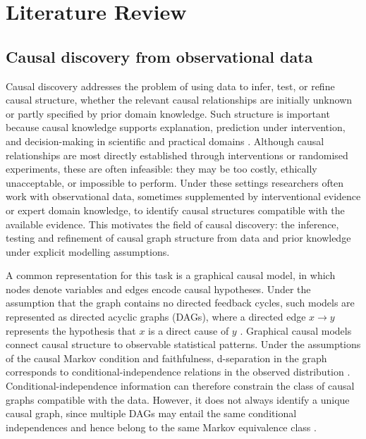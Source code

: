 \chapter{Literature Review}

\section{Causal discovery from observational data}
Causal discovery addresses the problem of using data to infer, test, or refine causal structure, whether the relevant causal relationships are initially unknown or partly specified by prior domain knowledge. Such structure is important because causal knowledge supports explanation, prediction under intervention, and decision-making in scientific and practical domains \cite{glymour2019review,vowels2022d}. Although causal relationships are most directly established through interventions or randomised experiments, these are often infeasible: they may be too costly, ethically unacceptable, or impossible to perform. Under these settings researchers often work with observational data, sometimes supplemented by interventional evidence or expert domain knowledge, to identify causal structures compatible with the available evidence. This motivates the field of causal discovery: the inference, testing and refinement of causal graph structure from data and prior knowledge under explicit modelling assumptions.

A common representation for this task is a graphical causal model, in which nodes denote variables and edges encode causal hypotheses. Under the assumption that the graph contains no directed feedback cycles, such models are represented as directed acyclic graphs (DAGs), where a directed edge \(x \to y\) represents the hypothesis that \(x\) is a direct cause of \(y\) \cite{glymour2019review}. Graphical causal models connect causal structure to observable statistical patterns. Under the assumptions of the causal Markov condition and faithfulness, d-separation in the graph corresponds to conditional-independence relations in the observed distribution \cite{glymour2019review}. Conditional-independence information can therefore constrain the class of causal graphs compatible with the data. However, it does not always identify a unique causal graph, since multiple DAGs may entail the same conditional independences and hence belong to the same Markov equivalence class \cite{glymour2019review}.

